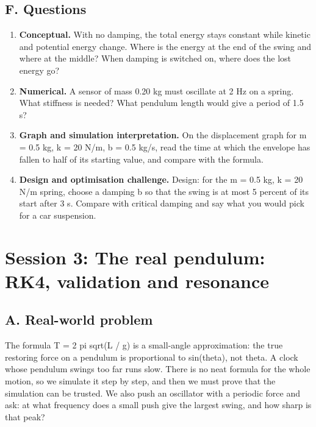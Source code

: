 \documentclass[11pt,a4paper]{article}
\begin{document}
\subsection*{F. Questions}
\begin{enumerate}[nosep]
\item \textbf{Conceptual.} With no damping, the total energy stays constant while kinetic and potential energy change. Where is the energy at the end of the swing and where at the middle? When damping is switched on, where does the lost energy go?
\item \textbf{Numerical.} A sensor of mass 0.20 kg must oscillate at 2 Hz on a spring. What stiffness is needed? What pendulum length would give a period of 1.5 s?
\item \textbf{Graph and simulation interpretation.} On the displacement graph for m = 0.5 kg, k = 20 N/m, b = 0.5 kg/s, read the time at which the envelope has fallen to half of its starting value, and compare with the formula.
\item \textbf{Design and optimisation challenge.} Design: for the m = 0.5 kg, k = 20 N/m spring, choose a damping b so that the swing is at most 5 percent of its start after 3 s. Compare with critical damping and say what you would pick for a car suspension.
\end{enumerate}

\section{Session 3: The real pendulum: RK4, validation and resonance}

\subsection*{A. Real-world problem}
The formula T = 2 pi sqrt(L / g) is a small-angle approximation: the true restoring force on a pendulum is proportional to sin(theta), not theta. A clock whose pendulum swings too far runs slow. There is no neat formula for the whole motion, so we simulate it step by step, and then we must prove that the simulation can be trusted. We also push an oscillator with a periodic force and ask: at what frequency does a small push give the largest swing, and how sharp is that peak?
\end{document}
